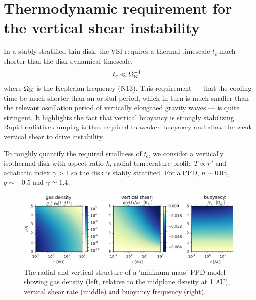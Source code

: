 \documentclass[iop, numberedappendix]{emulateapj}
\def \OmK {\Omega_{\rm K}}
\begin{document}
\section{Thermodynamic requirement for the vertical shear instability}\label{vsi_require}     
In a stably stratified thin disk, the VSI  
requires a thermal timescale $t_c$ much shorter than the
disk dynamical timescale, 
\begin{align}
  t _c \ll \OmK^{-1}. 
\end{align}
where $\OmK$ is the Keplerian frequency (N13).    
This requirement --- that the cooling time be much shorter than an orbital period, 
which in turn is much smaller than the relevant oscillation period of vertically elongated gravity waves  --- is quite stringent.
It highlights the fact that vertical buoyancy is strongly 
stabilizing. Rapid radiative damping is thus required to weaken
buoyancy and allow the weak vertical shear to drive instability.   

To roughly quantify the required smallness of $t_c$, we consider a
vertically isothermal disk with aspect-ratio $ h$, 
 radial temperature profile $T \propto r^q$ and adiabatic index
$\gamma>1$ so the disk is stably stratified.  For a PPD, $ h \sim 0.05$,
$q\sim -0.5$ and $\gamma\simeq 1.4$.  

\begin{figure}
  \includegraphics[width=\linewidth]{figures/rhoshearNz}
  \caption{The radial and vertical structure of a `minimum mass' PPD model showing gas density (left, relative to the midplane density at 1 AU), vertical shear rate (middle) and
    buoyancy frequency (right).
    \label{eqm_structure} 
  }
\end{figure}
\end{document}
